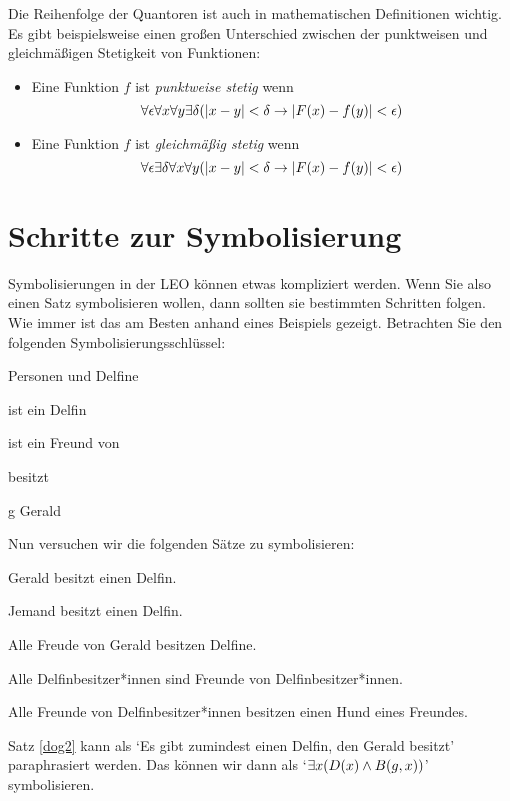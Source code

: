    
Die Reihenfolge der Quantoren ist auch in mathematischen Definitionen wichtig. Es gibt beispielsweise einen gro{\ss}en Unterschied zwischen der punktweisen und gleichmä{\ss}igen Stetigkeit von Funktionen:
\begin{itemize}
\item Eine Funktion $f$ ist \emph{punktweise stetig} wenn
\[
\forall \epsilon\forall x\forall y\exists \delta(\left|x - y\right| < \delta \to \left|\mathord{F}(x) - f(y)\right| < \epsilon)
\]
\item Eine Funktion $f$ ist \emph{gleichmä{\ss}ig stetig} wenn
\[
\forall \epsilon\exists \delta\forall x\forall y(\left|x - y\right| < \delta \to \left|\mathord{F}(x) - f(y)\right| < \epsilon)
\]
\end{itemize}

\section{Schritte zur Symbolisierung}
Symbolisierungen in der LEO können etwas kompliziert werden. Wenn Sie also einen Satz symbolisieren wollen, dann sollten sie bestimmten Schritten folgen. Wie immer ist das am Besten anhand eines Beispiels gezeigt. Betrachten Sie den folgenden Symbolisierungsschlüssel: 
\begin{ekey}
\item[\text{Domäne}] Personen und Delfine
\item[\atom{D}{x}]  ist ein Delfin
\item[\atom{F}{x,y}]  ist ein Freund von 
\item[\atom{B}{x,y}]  besitzt  %
\item[g] Gerald
\end{ekey}
Nun versuchen wir die folgenden Sätze zu symbolisieren:
\begin{earg}
\item[\ex{dog2}] Gerald besitzt einen Delfin.
\item[\ex{dog3}] Jemand besitzt einen Delfin.
\item[\ex{dog4}] Alle Freude von Gerald besitzen Delfine.
\item[\ex{dog5}] Alle Delfinbesitzer*innen sind Freunde von Delfinbesitzer*innen.
\item[\ex{dog6}] Alle Freunde von Delfinbesitzer*innen besitzen einen Hund eines Freundes.
\end{earg}
Satz \ref{dog2} kann als `Es gibt zumindest einen Delfin, den Gerald besitzt' paraphrasiert werden. Das können wir dann als `$\exists x(\mathord{D}(x) \wedge \mathord{B}(g,x))$' symbolisieren.

